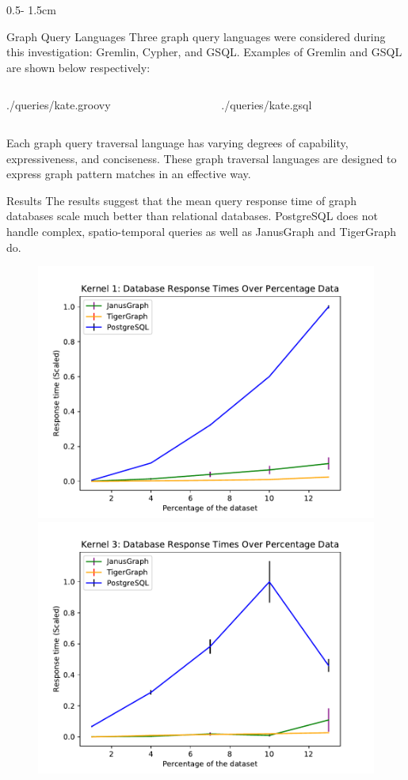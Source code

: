 \documentclass{uioposter}
\begin{document}
\begin{frame}
\begin{columns}[onlytextwidth]
\begin{column}{0.5\textwidth - 1.5cm}
    \begin{block}{Graph Query Languages}
        Three graph query languages were considered during this investigation: Gremlin, Cypher, and GSQL. Examples of Gremlin and GSQL are shown below respectively:
        \begin{columns}
            \hspace{5pt}
            \begin{column}{.49\textwidth}
                
                {./queries/kate.groovy}
            \end{column}%
            \begin{column}{.49\textwidth}
                
                {./queries/kate.gsql}
            \end{column}%
        \end{columns}
        Each graph query traversal language has varying degrees of capability, expressiveness, and conciseness. These graph traversal languages are designed to express graph pattern matches in an effective way.
    \end{block}

    \begin{block}{Results}
        The results suggest that the mean query response time of graph databases scale much better than relational databases. PostgreSQL does not handle complex, spatio-temporal queries as well as JanusGraph and TigerGraph do.
        \begin{figure}
            \centering
            
            \includegraphics[width=.49\textwidth]{img/results/katePlotSetup1.pdf}
            \hfill
            \includegraphics[width=.49\textwidth]{img/results/cityPlotSetup1.pdf}
            

\end{figure}
\end{block}
\end{column}
\end{columns}
\end{frame}
\end{document}
